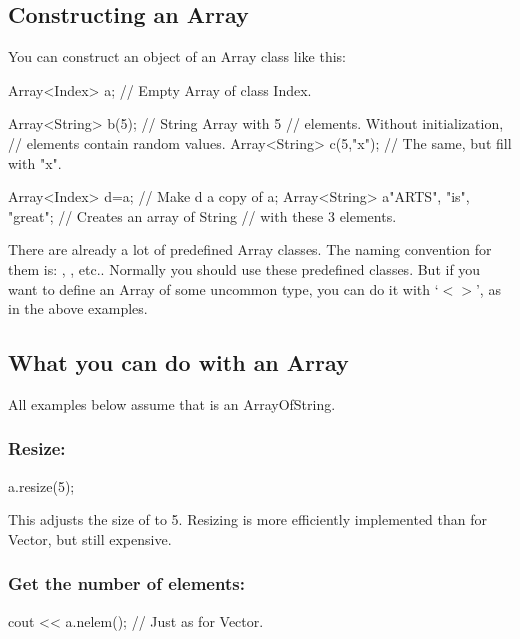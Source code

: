 \subsection{Constructing an Array}
You can construct an object of an Array class like this:

\begin{code}
Array<Index>  a;        // Empty Array of class Index.

Array<String> b(5);     // String Array with 5
                        // elements. Without initialization, 
                        // elements contain random values.
Array<String> c(5,"x"); // The same, but fill with "x".

Array<Index>  d=a;      // Make d a copy of a;
Array<String> a{"ARTS",
                "is",
                "great"}; // Creates an array of String
                          // with these 3 elements.
\end{code}

There are already a lot of predefined Array classes. The naming
convention for them is: , ,
etc.. Normally you should use these predefined classes. But if you want
to define an Array of some uncommon type, you can do it with `$<>$',
as in the above examples.

\begin{code}

\end{code}

\subsection{What you can do with an Array}

All examples below assume that  is an ArrayOfString.

\subsubsection{Resize:}
\begin{code}
a.resize(5);
\end{code}

This adjusts the size of  to 5. Resizing is more efficiently
implemented than for Vector, but still expensive.

\subsubsection{Get the number of elements:}
\begin{code}
cout << a.nelem();  // Just as for Vector.
\end{code}

